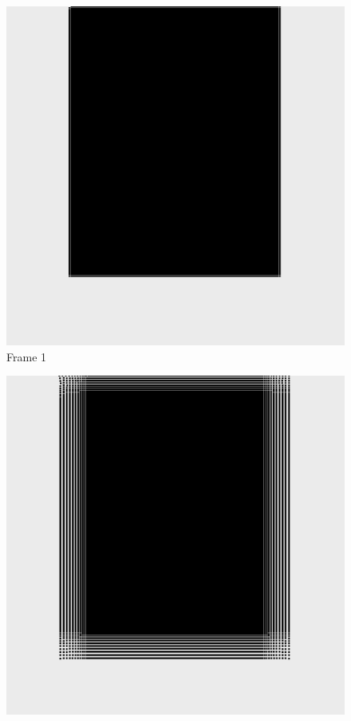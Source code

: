 \documentclass[a4paper, 12pt, oneside]{book}
\begin{document}
\begin{figure}[!ht]
        \begin{center}
            \includegraphics[width=\linewidth]{images/test_case_1/1.png}
            Frame 1
        \end{center}
    \endminipage
    \hfill
        \begin{center}
            \includegraphics[width=\linewidth]{images/test_case_1/21.png}

\end{center}
\end{figure}
\end{document}
